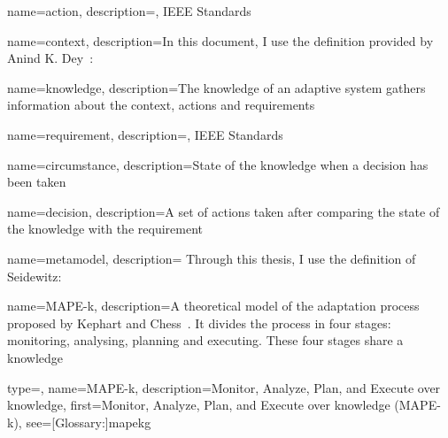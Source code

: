 {
	name={action},
	description={, IEEE Standards~\cite{iso2017systems}}
}

{
	name={context},
	description={In this document, I use the definition provided by Anind K. Dey~\cite{DBLP:journals/puc/Dey01}: }
}

{
	name={knowledge},
	description={The knowledge of an adaptive system gathers information about the \gls{context}, \glspl{action} and \glspl{requirement}}
}

{
	name={requirement},
	description={, IEEE Standards~\cite{iso2017systems}}
}

{
	name={circumstance},
	description={State of the \gls{knowledge} when a \gls{decision} has been taken}
}

{
	name={decision},
	description={A set of \glspl{action} taken after comparing the state of the \gls{knowledge} with the \gls{requirement}}
}

{
	name={metamodel},
	description={
Through this thesis, I use the definition of Seidewitz: ~\cite{DBLP:journals/software/Seidewitz03}
	}
}

{
	name={MAPE-k},
    description={A theoretical model of the adaptation process proposed by Kephart and Chess~\cite{DBLP:journals/computer/KephartC03}. It divides the process in four stages: monitoring, analysing, planning and executing. These four stages share a \gls{knowledge}}
}

{
	type=\acronymtype, 
	name={MAPE-k}, 
	description={Monitor, Analyze, Plan, and Execute over knowledge}, 
	first={Monitor, Analyze, Plan, and Execute over knowledge (MAPE-k)}, 
	see=[Glossary:]{mapekg}
}




